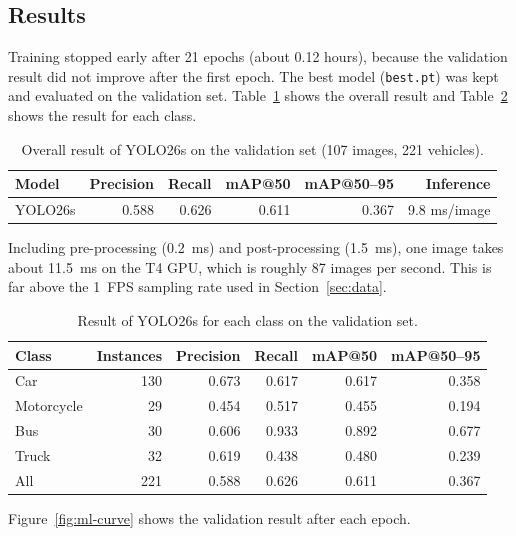 \documentclass[12pt,a4paper]{article}
\begin{document}
\subsection{Results}
\label{subsec:ml-results}
Training stopped early after 21 epochs (about 0.12 hours), because the
validation result did not improve after the first epoch. The best model
(\texttt{best.pt}) was kept and evaluated on the validation set.
Table~\ref{tab:ml-results} shows the overall result and
Table~\ref{tab:ml-class} shows the result for each class.

\begin{table}[H]
\centering
\caption{Overall result of YOLO26s on the validation set (107 images, 221 vehicles).}
\label{tab:ml-results}
\begin{tabular}{@{}lrrrrr@{}}
\toprule
\textbf{Model} & \textbf{Precision} & \textbf{Recall} & \textbf{mAP@50} & \textbf{mAP@50--95} & \textbf{Inference} \\
\midrule
YOLO26s & 0.588 & 0.626 & 0.611 & 0.367 & 9.8 ms/image \\
\bottomrule
\end{tabular}
\end{table}

Including pre-processing (0.2~ms) and post-processing (1.5~ms), one image takes
about 11.5~ms on the T4 GPU, which is roughly 87 images per second. This is far
above the 1~FPS sampling rate used in Section~\ref{sec:data}.

\begin{table}[H]
\centering
\caption{Result of YOLO26s for each class on the validation set.}
\label{tab:ml-class}
\begin{tabular}{@{}lrrrrr@{}}
\toprule
\textbf{Class} & \textbf{Instances} & \textbf{Precision} & \textbf{Recall} & \textbf{mAP@50} & \textbf{mAP@50--95} \\
\midrule
Car        & 130 & 0.673 & 0.617 & 0.617 & 0.358 \\
Motorcycle &  29 & 0.454 & 0.517 & 0.455 & 0.194 \\
Bus        &  30 & 0.606 & 0.933 & 0.892 & 0.677 \\
Truck      &  32 & 0.619 & 0.438 & 0.480 & 0.239 \\
\midrule
All        & 221 & 0.588 & 0.626 & 0.611 & 0.367 \\
\bottomrule
\end{tabular}
\end{table}

Figure~\ref{fig:ml-curve} shows the validation result after each epoch.
\end{document}
